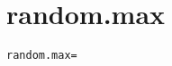 \section{random.max}
\label{configuration:RandomMax}
\AvailableInJavaOnly{\TODO}
\begin{lstlisting}[style=Props,caption={Usage example for \textit{random.max}}]
random.max=
\end{lstlisting}